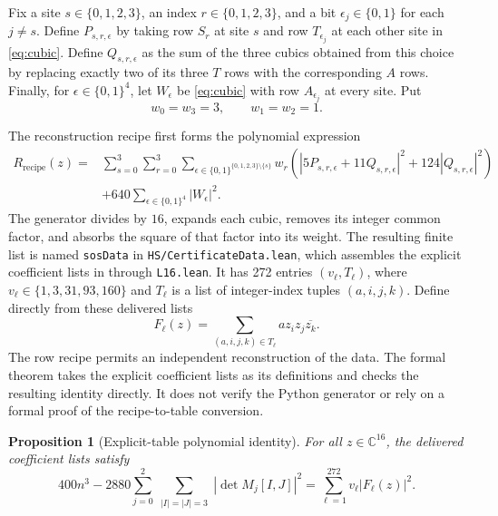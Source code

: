 \documentclass[11pt]{article}
\newtheorem{proposition}[theorem]{Proposition}
\theoremstyle{definition}
\theoremstyle{remark}
\newcommand{\C}{\mathbb C}
\newcommand{\conj}[1]{\overline{#1}}
\begin{document}
Fix a site $s\in\{0,1,2,3\}$, an index $r\in\{0,1,2,3\}$, and a bit
$\epsilon_j\in\{0,1\}$ for each $j\ne s$. Define
$P_{s,r,\epsilon}$ by taking row $S_r$ at site $s$ and row
$T_{\epsilon_j}$ at each other site in \eqref{eq:cubic}. Define
$Q_{s,r,\epsilon}$ as the sum of the three cubics obtained from this
choice by replacing exactly two of its three $T$ rows with the
corresponding $A$ rows. Finally, for $\epsilon\in\{0,1\}^4$, let
$W_\epsilon$ be \eqref{eq:cubic} with row $A_{\epsilon_j}$ at every
site. Put
\begin{equation}
 w_0=w_3=3,\qquad w_1=w_2=1.
 \label{eq:weights}
\end{equation}

The reconstruction recipe first forms the polynomial expression
\begin{align*}
 R_{\mathrm{recipe}}(z)={}&
 \sum_{s=0}^3\sum_{r=0}^3\sum_{\epsilon\in\{0,1\}^{\{0,1,2,3\}\setminus\{s\}}}
 w_r\left(|5P_{s,r,\epsilon}+11Q_{s,r,\epsilon}|^2
             +124|Q_{s,r,\epsilon}|^2\right)
 \\
 &+640\sum_{\epsilon\in\{0,1\}^4}|W_\epsilon|^2.
\end{align*}
The generator divides by $16$, expands each cubic, removes its integer
common factor, and absorbs the square of that factor into its weight.
The resulting finite list is named \texttt{sosData} in
\texttt{HS/CertificateData.lean}, which assembles the explicit coefficient
lists in  through
\texttt{L16.lean}. It has 272 entries
$(v_\ell,T_\ell)$, where $v_\ell\in\{1,3,31,93,160\}$ and
$T_\ell$ is a list of integer-index tuples $(a,i,j,k)$.
Define directly from these delivered lists
\[
 F_\ell(z)=\sum_{(a,i,j,k)\in T_\ell}a z_i z_j\conj{z_k}.
\]
The row recipe permits an independent reconstruction of the data. The
formal theorem takes the explicit coefficient lists as its definitions
and checks the resulting identity directly. It does not verify the
Python generator or rely on a formal proof of the recipe-to-table
conversion.

\begin{samepage}
\begin{proposition}[Explicit-table polynomial identity]
\label{prop:certificate}
For all $z\in\C^{16}$, the delivered coefficient lists satisfy
\begin{equation}
 400n^3-2880
   \sum_{j=0}^2\sum_{\substack{|I|=|J|=3}}|\det M_j[I,J]|^2
 =\sum_{\ell=1}^{272}v_\ell|F_\ell(z)|^2.
 \label{eq:certificate}
\end{equation}
\end{proposition}
\end{samepage}
\end{document}
